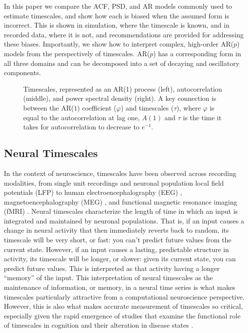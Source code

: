 \documentclass[pdflatex,sn-mathphys-num]{sn-jnl}
\begin{document}
In this paper we compare the ACF, PSD, and AR models commonly used to estimate timescales, and show how each is biased when the assumed form is incorrect. This is shown in simulation, where the timescale is known, and in recorded data, where it is not, and recommendations are provided for addressing these biases. Importantly, we show how to interpret complex, high-order AR($p$) models from the perspectively of timescales. AR($p$) has a corresponding form in all three domains and can be decomposed into a set of decaying and oscillatory components.

\begin{figure}[htbp]
  \centering
  
  \caption{Timescales, represented as an AR(1) process (left), autocorrelation (middle), and power spectral density (right). A key connection is between the AR($1$) coefficient ($\varphi$) and timescales ($\tau$), where $\varphi$ is equal to the autocorrelation at lag one, $A(1)$ and $\tau$ is the time it takes for autocorrelation to decrease to $e^{-1}$.}
  \label{fig:ar1}
\end{figure}

\subsection{Neural Timescales}\label{sec:neural}

In the context of neuroscience, timescales have been observed across recording modalities, from single unit recordings \cite{murray_hierarchy_2014} and neuronal population local field potentials (LFP) \cite{haider_millisecond_2016} to human electroencephalography (EEG) \cite{meisel_decline_2017}, magnetoencephalography (MEG) \cite{zhigalov_relationship_2015}, and functional magnetic resonance imaging (fMRI) \cite{watanabe_atypical_2019, raut_organization_2020}. Neural timescales characterize the length of time in which an input is integrated and maintained by neuronal populations. That is, if an input causes a change in neural activity that then immediately reverts back to random, its timescale will be very short, or fast: you can't predict future values from the current state. However, if an input causes a lasting, predictable structure in activity, its timescale will be longer, or slower: given its current state, you can predict future values. This is interpreted as that activity having a longer ``memory'' of the input. This interpretation of neural timescales as the maintenance of information, or memory, in a neural time series is what makes timescales particularly attractive from a computational neuroscience perspective. However, this is also what makes accurate measurement of timescales so critical, especially given the rapid emergence of studies that examine the functional role of timescales in cognition \cite{cavanagh_diversity_2020, gao_neuronal_2020} and their alteration in disease states \cite{watanabe_atypical_2019, wengler_distinct_2020}.
\end{document}
